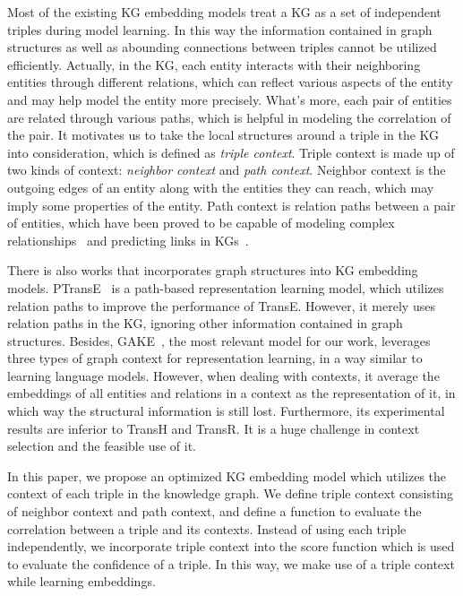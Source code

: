 Most of the existing KG embedding models treat a KG as a set of independent triples during model learning. In this way the information contained in graph structures as well as abounding connections between triples cannot be utilized efficiently. Actually, in the KG, each entity interacts with their neighboring entities through different relations, which can reflect various aspects of the entity and may help model the entity more precisely. What's more, each pair of entities are related through various paths, which is helpful in modeling the correlation of the pair. It motivates us to take the local structures around a triple in the KG into consideration, which is defined as \emph{triple context}. Triple context is made up of two kinds of context: \emph{neighbor context} and \emph{path context}. Neighbor context is the outgoing edges of an entity along with the entities they can reach, which may imply some properties of the entity. Path context is relation paths between a pair of entities, which have been proved to be capable of modeling complex relationships~\cite{LinLLSRL15} and predicting links in KGs~\cite{DBLP:conf/emnlp/LaoMC11}.

There is also works that incorporates graph structures into KG embedding models. PTransE~\cite{LinLLSRL15} is a path-based representation learning model, which utilizes relation paths to improve the performance of TransE. However, it merely uses relation paths in the KG, ignoring other information contained in graph structures. Besides, GAKE~\cite{FengHYZ16}, the most relevant model for our work, leverages three types of graph context for representation learning, in a way similar to learning language models. However, when dealing with contexts, it average the embeddings of all entities and relations in a context as the representation of it, in which way the structural information is still lost. Furthermore, its experimental results are inferior to TransH and TransR. It is a huge challenge in context selection and the feasible use of it.

In this paper, we propose an optimized KG embedding model which utilizes the context of each triple in the knowledge graph. We define triple context consisting of neighbor context and path context, and define a function to evaluate the correlation between a triple and its contexts. Instead of using each triple independently, we incorporate triple context into the score function which is used to evaluate the confidence of a triple. In this way, we make use of a triple context while learning embeddings.

